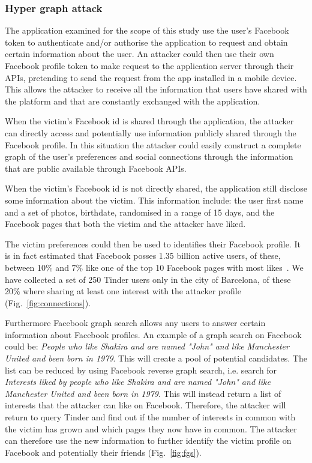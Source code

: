 \subsubsection{Hyper graph attack}
\noindent
The application examined for the scope of this study use the user's Facebook token to authenticate and/or authorise the application to request and obtain certain information about the user.
An attacker could then use their own Facebook profile token to make request to the application server through their APIs, pretending to send the request from the app installed in a mobile device. This allows the attacker to receive all the information that users have shared with the platform and that are constantly exchanged with the application.

When the victim's Facebook id is shared through the application, the attacker can directly access and potentially use information publicly shared through the Facebook profile. In this situation the attacker could easily construct a complete graph of the user's preferences and social connections through the information that are public available through Facebook APIs.

When the victim's Facebook id is not directly shared, the application still disclose some information about the victim. This information include: the user first name and a set of photos, birthdate, randomised in a range of 15 days, and the Facebook pages that both the victim and the attacker have liked.

The victim preferences could then be used to identifies their Facebook profile. It is in fact estimated that Facebook posses 1.35 billion active users, of these, between 10\% and 7\% like one of the top 10 Facebook pages with most likes~\cite{pagedata}. We have collected a set of 250 Tinder users only in the city of Barcelona, of these 20\% where sharing at least one interest with the attacker profile (Fig.~\ref{fig:connections}).

Furthermore Facebook graph search allows any users to answer certain information about Facebook profiles. An example of a graph search on Facebook could be: \emph{People who like Shakira and are named "John" and like Manchester United and been born in 1979}. This will create a pool of potential candidates. The list can be reduced by using Facebook reverse graph search, i.e. search for \emph{Interests liked by people who like Shakira and are named "John" and like Manchester United and been born in 1979}.  This will instead return a list of interests that the attacker can like on Facebook. Therefore, the attacker will return to query Tinder and find out if the number of interests in common with the victim has grown and which pages they now have in common. The attacker can therefore use the new information to further identify the victim profile on Facebook and potentially their friends (Fig.~\ref{fig:fgs}).

